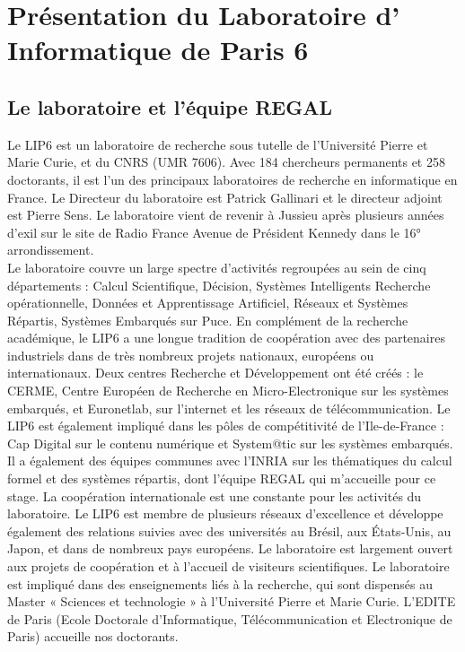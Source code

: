 \section{Présentation du Laboratoire d' Informatique de Paris 6}
	\subsection{Le laboratoire et l'équipe REGAL}
	\par Le LIP6 est un laboratoire de recherche sous tutelle de l'Université Pierre et Marie Curie, et du CNRS (UMR 7606). Avec 184 chercheurs permanents et 258 doctorants, il est l'un des principaux laboratoires de recherche en informatique en France. Le Directeur du laboratoire est Patrick Gallinari et le directeur adjoint est Pierre Sens. Le laboratoire vient de revenir à Jussieu après plusieurs années d'exil sur le site de Radio France Avenue de Président Kennedy dans le 16° arrondissement.\\
	Le laboratoire couvre un large spectre d'activités regroupées au sein de cinq départements : Calcul Scientifique, Décision, Systèmes Intelligents Recherche opérationnelle, Données et Apprentissage Artificiel, Réseaux et Systèmes Répartis, Systèmes Embarqués sur Puce. En complément de la recherche académique, le LIP6 a une longue tradition de coopération avec des partenaires industriels dans de très nombreux projets nationaux, européens ou internationaux. Deux centres Recherche et Développement  ont été créés : le CERME, Centre Européen de Recherche en Micro-Electronique sur les systèmes embarqués, et Euronetlab, sur l'internet et les réseaux de télécommunication. Le LIP6 est également impliqué dans les pôles de compétitivité de l'Ile-de-France : Cap Digital sur le contenu numérique et System@tic sur les systèmes embarqués.\\
	Il a également des équipes communes avec l'INRIA sur les thématiques du calcul formel et des systèmes répartis, dont l'équipe REGAL qui m'accueille pour ce stage. La coopération internationale est une constante pour les activités du laboratoire. Le LIP6 est membre de plusieurs réseaux d'excellence et développe également des relations suivies avec des universités au Brésil, aux États-Unis, au Japon, et dans de nombreux pays européens. Le laboratoire est largement ouvert aux projets de coopération et à l'accueil de visiteurs scientifiques. Le laboratoire est impliqué dans des enseignements liés à la recherche, qui sont dispensés au Master « Sciences et technologie » à l'Université Pierre et Marie Curie. L'EDITE de Paris (Ecole Doctorale d'Informatique, Télécommunication et Electronique de Paris) accueille nos doctorants.\\

